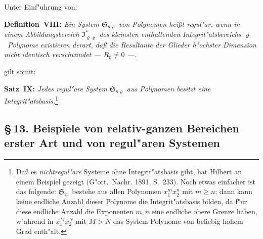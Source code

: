 \documentclass[11pt,a4paper]{article}
\begin{document}
Unter Einf"{u}hrung von:

\medskip
\noindent
\textbf{Definition~VIII:} \emph{Ein System $\mathfrak{S}_{n\varrho}$ von Polynomen hei\ss{}t
\emph{regul"{a}r}, wenn in einem Abbildungsbereich $\mathfrak{I}_{\varrho\varrho}^{*}$ des kleinsten
enthaltenden Integrit"{a}tsbereichs $\varrho$~Polynome existieren derart, da\ss{}
die Resultante der Glieder h"{o}chster Dimension nicht identisch verschwindet
--- $R_{0}\neq 0$ ---.}

gilt somit:

\medskip
\noindent
\textbf{Satz~IX:} \emph{Jedes regul"{a}re System $\mathfrak{S}_{n\varrho}$ aus Polynomen besitzt
eine Integrit"{a}tsbasis.}\footnote{Da\ss{} es \emph{nichtregul"{a}re} Systeme ohne
Integrit"{a}tsbasis gibt, hat Hilbert an einem Beispiel gezeigt (G"{o}tt.\ Nachr.
1891, S.\ 233). Noch etwas einfacher ist das folgende: $\mathfrak{S}_{21}$ bestehe aus allen
Polynomen $x_{1}^{m}x_{2}^{n}$ mit $m\ge n$; dann kann keine endliche Anzahl dieser Polynome
die Integrit"{a}tsbasis bilden, da f"{u}r diese endliche Anzahl die Exponenten $m,n$
eine endliche obere Grenze haben, w"{a}hrend in $x_{1}^{M}x_{2}^{N}$ mit $M>N$ das System
Polynome von beliebig hohem Grad enth"{a}lt.}

\subsection*{\S\,13. Beispiele von relativ-ganzen Bereichen erster Art und von regul"{a}ren Systemen}
\end{document}
